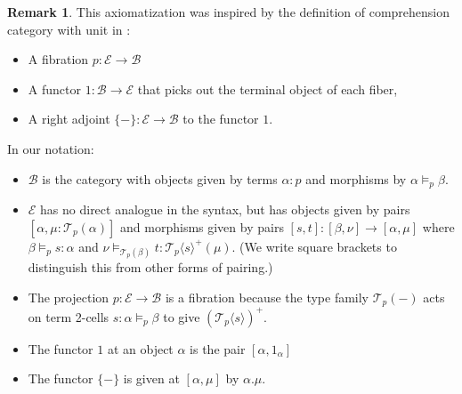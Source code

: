 \documentclass[10pt]{article}
\theoremstyle{definition}
\newtheorem{remark}{Remark}
\newcommand\El[2]{\mathcal{T}_{#1}(#2)}
\newcommand\ApEl[2]{\mathcal{T}_{#1}\langle#2\rangle}
\begin{document}
\begin{remark}
This axiomatization was inspired by the definition of comprehension
category with unit in \cite{ahman+16fibered}:
\begin{itemize}
\item A fibration $p : \mathcal{E} \to \mathcal{B}$
\item A functor $1 : \mathcal{B} \to \mathcal{E}$ that picks out the terminal object of each fiber,
\item A right adjoint $\{-\} : \mathcal{E} \to \mathcal{B}$ to the functor $1$.
\end{itemize}
In our notation:
\begin{itemize}
\item $\mathcal{B}$ is the category with objects given by terms $\alpha
  : p$ and morphisms by $\alpha \vDash_p \beta$.

\item $\mathcal{E}$ has no direct analogue in the syntax, but has
  objects given by pairs $[\alpha, \mu : \El{p}{\alpha}]$ and morphisms given by pairs
  $[s, t] : [\beta, \nu] \to [\alpha, \mu]$ where $\beta \vDash_p s :
  \alpha$ and $\nu \vDash_{\El{p}{\beta}} t : \ApEl{p}{s}^+ (\mu)$. (We
  write square brackets to distinguish this from other forms of
  pairing.)

\item The projection $p : \mathcal{E} \to \mathcal{B}$ is a fibration
  because the type family $\El{p}{-}$ acts on term 2-cells $s : \alpha
  \vDash_p \beta$ to give $(\ApEl{p}{s})^+$.

\item The functor $1$ at an object $\alpha$ is the pair $[\alpha, 1_\alpha]$
  
\item The functor $\{-\}$ is given at $[\alpha, \mu]$ by $\alpha.\mu$.
\end{itemize}


\end{remark}
\end{document}
